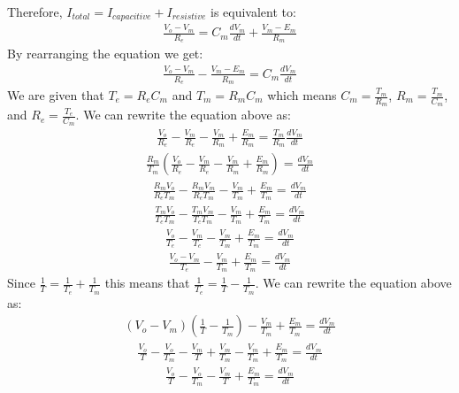 \documentclass[11pt]{article}
\begin{document}
\begin{enumerate}[label=\arabic*.]
\begin{enumerate}[label=(\alph*)]
Therefore, $I_{total} = I_{capacitive} + I_{resistive}$ is equivalent to:
\begin{align*}
\frac{V_o - V_m} {R_e} = C_m \frac{dV_m} {dt} + \frac{V_m - E_m} {R_m}
\end{align*}
By rearranging the equation we get:
\begin{align*}
\frac{V_o - V_m} {R_e} - \frac{V_m - E_m} {R_m} = C_m \frac{dV_m} {dt}
\end{align*}
We are given that $T_e = R_e C_m$ and $T_m = R_m C_m$ which means $C_m = \frac{T_m} {R_m}$, $R_m = \frac{T_m} {C_m}$, and $R_e = \frac{T_e} {C_m}$. We can rewrite the equation above as:
\begin{align*}
\frac{V_o} {R_e} - \frac{V_m} {R_e} - \frac{V_m} {R_m} + \frac{E_m} {R_m} = \frac{T_m} {R_m} \frac{dV_m} {dt}
\end{align*}
\begin{align*}
 \frac{R_m} {T_m} (\frac{V_o} {R_e} - \frac{V_m} {R_e} - \frac{V_m} {R_m} + \frac{E_m} {R_m}) = \frac{dV_m} {dt}
\end{align*}
\begin{align*}
\frac{R_m V_o} {R_e T_m} - \frac{R_m V_m} {R_e T_m} - \frac{V_m} {T_m} + \frac{E_m} {T_m} = \frac{dV_m} {dt}
\end{align*}
\begin{align*}
\frac{T_m V_o} {T_e T_m} - \frac{T_m V_m} {T_e T_m} - \frac{V_m} {T_m} + \frac{E_m} {T_m} = \frac{dV_m} {dt}
\end{align*}
\begin{align*}
\frac{V_o} {T_e} - \frac{V_m} {T_e} - \frac{V_m} {T_m} + \frac{E_m} {T_m} = \frac{dV_m} {dt}
\end{align*}
\begin{align*}
\frac{V_o - V_m} {T_e} - \frac{V_m} {T_m} + \frac{E_m} {T_m} = \frac{dV_m} {dt}
\end{align*}
Since $\frac{1} {T} = \frac{1} {T_e} + \frac{1} {T_m}$ this means that $\frac{1} {T_e} = \frac{1} {T} - \frac{1} {T_m}$. We can rewrite the equation above as:
\begin{align*}
\left(V_o - V_m\right)\left(\frac{1} {T} - \frac{1} {T_m}\right) - \frac{V_m} {T_m} + \frac{E_m} {T_m} = \frac{dV_m} {dt}
\end{align*}
\begin{align*}
\frac{V_o} {T} - \frac{V_o} {T_m} - \frac{V_m} {T} + \frac{V_m} {T_m} - \frac{V_m} {T_m} + \frac{E_m} {T_m} = \frac{dV_m} {dt}
\end{align*}
\begin{align*}
\frac{V_o} {T} - \frac{V_o} {T_m} - \frac{V_m} {T} + \frac{E_m} {T_m} = \frac{dV_m} {dt}

\end{align*}
\end{enumerate}
\end{enumerate}
\end{document}
